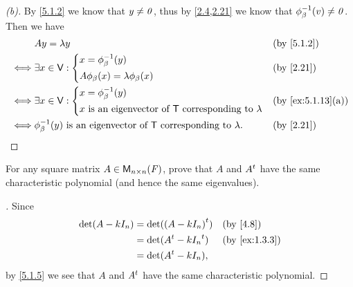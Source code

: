 \begin{proof}[(b)]
  By \cref{5.1.2} we know that \(y \neq \mathit{0}\), thus by \cref{2.4,2.21} we know that \(\phi_{\beta}^{-1}(v) \neq \mathit{0}\).
  Then we have
  \begin{align*}
         & A y = \lambda y                                                                          &  & \text{(by \cref{5.1.2})} \\
    \iff & \exists x \in \V : \begin{dcases}
                                x = \phi_{\beta}^{-1}(y) \\
                                A \phi_{\beta}(x) = \lambda \phi_{\beta}(x)
                              \end{dcases}                                              &  & \text{(by \cref{2.21})}              \\
    \iff & \exists x \in \V : \begin{dcases}
                                x = \phi_{\beta}^{-1}(y) \\
                                x \text{ is an eigenvector of } \T \text{ corresponding to } \lambda
                              \end{dcases}                     &  & \text{(by \cref{ex:5.1.13}(a))}                               \\
    \iff & \phi_{\beta}^{-1}(y) \text{ is an eigenvector of } \T \text{ corresponding to } \lambda. &  & \text{(by \cref{2.21})}
  \end{align*}
\end{proof}

\begin{ex}\label{ex:5.1.14}
  For any square matrix \(A \in \mathsf{M}_{{n} \times n}({\mathit{F}})\), prove that \(A\) and \({A}^{t}\) have the same characteristic polynomial (and hence the same eigenvalues).
\end{ex}

\begin{proof}[]
  Since
  \begin{align*}
    \det(A - k I_n) & = \det(\tp{(A - k I_n)})    &  & \text{(by \cref{4.8})}      \\
                    & = \det(\tp{A} - k \tp{I_n}) &  & \text{(by \cref{ex:1.3.3})} \\
                    & = \det(\tp{A} - k I_n),
  \end{align*}
  by \cref{5.1.5} we see that \(A\) and \({A}^{t}\) have the same characteristic polynomial.
\end{proof}

